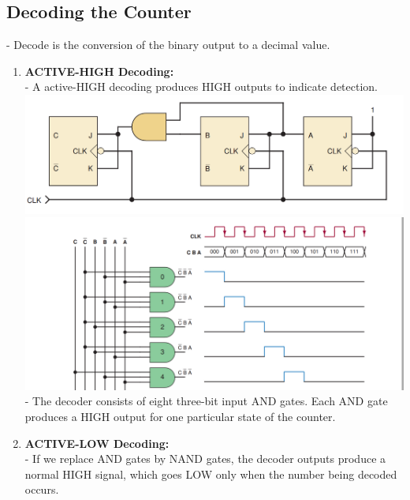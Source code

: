 \documentclass[12pt]{article}
\begin{document}
\subsection{Decoding the Counter}
- Decode is the conversion of the binary output to a decimal value. \\
\begin{enumerate}
	\item \textbf{ACTIVE-HIGH Decoding: } \\
	- A active-HIGH decoding produces HIGH outputs to indicate detection. \\
	\includegraphics[scale = 0.7]{hinh55}
	\bigbreak
	\includegraphics[scale = 0.5]{hinh56}
	\bigbreak
	- The decoder consists of eight three-bit input AND gates. Each AND gate produces a HIGH output for one particular state of the counter. \\
	\item \textbf{ACTIVE-LOW Decoding: } \\
	- If we replace AND gates by NAND gates, the decoder outputs produce a normal HIGH signal, which goes LOW only when the number being decoded occurs. \\
\end{enumerate}
\end{document}
